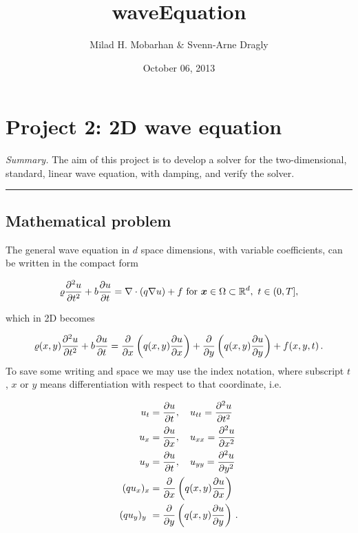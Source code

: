 \documentclass[letterpaper,10pt,english]{/usr/share/sphinx/texinputs/sphinxhowto}
\title{waveEquation}
\date{October 06, 2013}
\author{Milad H. Mobarhan \& Svenn-Arne Dragly}
\begin{document}
        
            \maketitle
        

        


        
        \section{Project 2: 2D wave equation}

\emph{Summary.} The aim of this project is to develop a solver for the
two-dimensional, standard, linear wave equation, with damping, and
verify the solver.\begin{center}\rule{3in}{0.4pt}\end{center}

\subsection{Mathematical problem}

The general wave equation in $d$ space dimensions, with variable
coefficients, can be written in the compact form

\[
\varrho\frac{\partial^2 u}{\partial t^2} +b \frac{\partial u}{\partial t} = \nabla\cdot (q\nabla u) + f\hbox{ for }\boldsymbol{x}\in\Omega\subset\mathbb{R}^d,\ t\in (0,T],
\]

which in 2D becomes

\[
\varrho(x,y)
\frac{\partial^2 u}{\partial t^2} +b \frac{\partial u}{\partial t} =
\frac{\partial}{\partial x}\left( q(x,y)
\frac{\partial u}{\partial x}\right)
+
\frac{\partial}{\partial y}\left( q(x,y)
\frac{\partial u}{\partial y}\right)
+ f(x,y,t)
\thinspace .
\] To save some writing and space we may use the index notation, where
subscript $t$, $x$ or $y$ means differentiation with respect to that
coordinate, i.e.

\begin{align*}
u_{t} &=\frac{\partial u}{\partial t} ,
\quad u_{tt} =\frac{\partial^2 u}{\partial t^2}\\
u_{x} &=\frac{\partial u}{\partial x} ,
\quad u_{xx} =\frac{\partial^2 u}{\partial x^2}\\
u_{y} &=\frac{\partial u}{\partial t} ,
\quad u_{yy} =\frac{\partial^2 u}{\partial y^2}\\
(q u_x)_x &= \frac{\partial}{\partial x}\left( q(x,y)
\frac{\partial u}{\partial x}\right)
\\
(q u_y)_y\ &=\frac{\partial}{\partial y}\left( q(x,y)
\frac{\partial u}{\partial y}\right)
\thinspace .
\end{align*}
\end{document}
